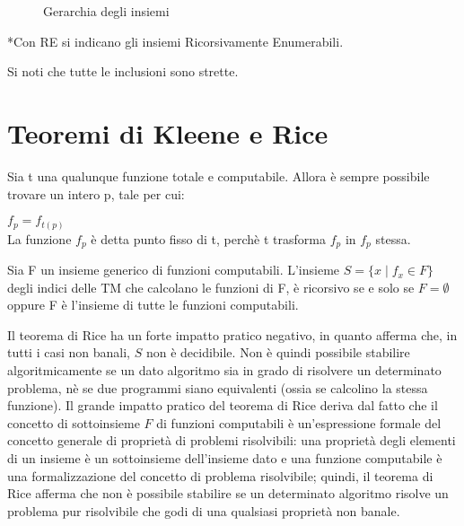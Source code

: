   \begin{figure}[!h]
    \begin{center}    
    \end{center}
    \caption{Gerarchia degli insiemi}    
  \end{figure}

  *Con RE si indicano gli insiemi Ricorsivamente Enumerabili.

  Si noti che tutte le inclusioni sono strette.

  \section{Teoremi di Kleene e Rice}

  \begin{theorem} 
    Sia t una qualunque funzione totale e computabile. Allora è sempre possibile trovare un intero p, tale per cui:
    
    \(f_p=f_{t(p)}\)\\
    La funzione \(f_p\) è detta punto fisso di t, perchè t trasforma \(f_p\) in \(f_p\) stessa.
  \end{theorem}

  \begin{theorem}
    Sia F un insieme generico di funzioni computabili. L'insieme \(S=\{x\;|\;f_x\in F\}\) degli indici delle TM che calcolano le funzioni di F, è ricorsivo se e solo se \(F=\emptyset\) oppure F è l'insieme di tutte le funzioni computabili.
  \end{theorem}

  Il teorema di Rice ha un forte impatto pratico negativo, in quanto afferma che, in tutti i casi non banali, \(S\) non è decidibile. Non è quindi possibile stabilire algoritmicamente se un dato algoritmo sia in grado di risolvere un determinato problema, nè se due programmi siano equivalenti (ossia se calcolino la stessa funzione). Il grande impatto pratico del teorema di Rice deriva dal fatto che il concetto di sottoinsieme \(F\) di funzioni computabili è un'espressione formale del concetto generale di proprietà di problemi risolvibili: una proprietà degli elementi di un insieme è un sottoinsieme dell'insieme dato e una funzione computabile è una formalizzazione del concetto di problema risolvibile; quindi, il teorema di Rice afferma che non è possibile stabilire se un determinato algoritmo risolve un problema pur risolvibile che godi di una qualsiasi proprietà non banale.